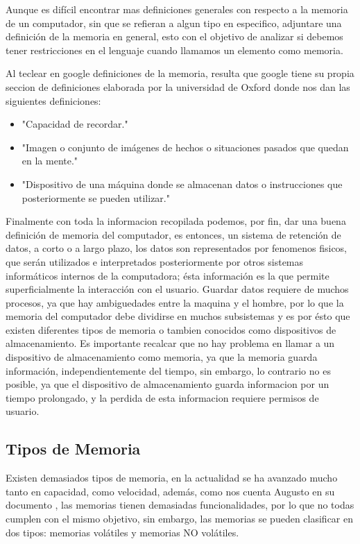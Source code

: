\documentclass{article}
\begin{document}
Aunque es difícil encontrar mas definiciones generales con respecto a la memoria de un computador, sin que se refieran a algun tipo en especifico, adjuntare una definición de la memoria en general, esto con el objetivo de analizar si debemos tener restricciones en el lenguaje cuando llamamos un elemento como memoria.

Al teclear en google definiciones de la memoria, resulta que google tiene su propia seccion de definiciones elaborada por la universidad de Oxford donde nos dan las siguientes definiciones:
\begin{itemize}
    \item
    "Capacidad de recordar."\cite{google}
    \item
    "Imagen o conjunto de imágenes de hechos o situaciones pasados que quedan en la mente."\cite{google}
    \item
    "Dispositivo de una máquina donde se almacenan datos o instrucciones que posteriormente se pueden utilizar."\cite{google}
\end{itemize}

Finalmente con toda la informacion recopilada podemos, por fin, dar una buena definición de memoria del computador, es entonces, un sistema de  retención de datos, a corto o a largo plazo, los datos son representados por fenomenos fisicos, que serán utilizados e interpretados posteriormente por otros sistemas informáticos internos de la computadora; ésta información es la que permite superficialmente la interacción con el usuario. Guardar datos requiere de muchos procesos, ya que hay ambiguedades entre la maquina y el hombre, por lo que la memoria del computador debe dividirse en muchos subsistemas y es por ésto que existen diferentes tipos de memoria o tambien conocidos como dispositivos de almacenamiento.
Es importante recalcar que no hay problema en llamar a un dispositivo de almacenamiento como memoria, ya que la memoria guarda información, independientemente del tiempo, sin embargo, lo contrario no es posible, ya que el dispositivo de almacenamiento guarda informacion por un tiempo prolongado, y la perdida de esta informacion requiere permisos de usuario.

\subsection{Tipos de Memoria}\label{pregunta2}
Existen demasiados tipos de memoria, en la actualidad se ha avanzado mucho tanto en capacidad, como velocidad, además, como nos cuenta Augusto en su documento \cite{referencia}, las memorias tienen demasiadas funcionalidades, por lo que no todas cumplen con el mismo objetivo, sin embargo, las memorias se pueden clasificar en dos tipos: memorias volátiles y memorias NO volátiles.
\end{document}
